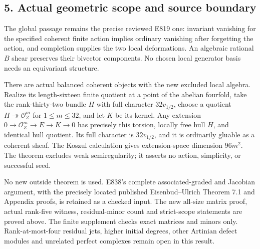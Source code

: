 \subsection{5. Actual geometric scope and source
boundary}\label{SF-E839:actual-geometric-scope-and-source-boundary}

The global passage remains the precise reviewed E819 one: invariant
vanishing for the specified coherent finite action implies ordinary
vanishing after forgetting the action, and completion supplies the two
local deformations. An algebraic rational \(B\) shear preserves their
bivector components. No chosen local generator basis needs an
equivariant structure.

There are actual balanced coherent objects with the new excluded local
algebra. Realize its length-sixteen finite quotient at a point of the
abelian fourfold, take the rank-thirty-two bundle \(H\) with full
character \(32v_{1/2}\), choose a quotient
\(H\twoheadrightarrow\mathcal O_Z^m\) for \(1\le m\le32\), and let \(K\)
be its kernel. Any extension \(0\to\mathcal O_Z^m\to E\to K\to0\) has
precisely this torsion, locally free hull \(H\), and identical hull
quotient. Its full character is \(32v_{1/2}\), and it is ordinarily
gluable as a coherent sheaf. The Koszul calculation gives
extension-space dimension \(96m^2\). The theorem excludes weak
semiregularity; it asserts no action, simplicity, or successful seed.

No new outside theorem is used. E838's complete associated-graded and
Jacobian argument, with the precisely located published Eisenbud--Ulrich
Theorem 7.1 and Appendix proofs, is retained as a checked input. The new
all-size matrix proof, actual rank-five witness, residual-minor count
and strict-scope statements are proved above. The finite supplement
checks exact matrices and minors only. Rank-at-most-four residual jets,
higher initial degrees, other Artinian defect modules and unrelated
perfect complexes remain open in this result.
